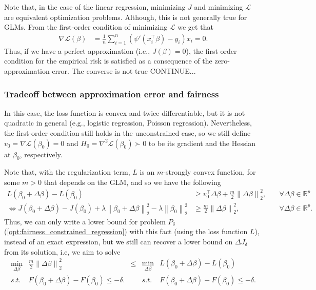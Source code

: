 \documentclass[11pt]{article}
\theoremstyle{plain}
\theoremstyle{definition}
\newcommand{\R}{\mathbb{R}}
\newcommand{\norm}[1]{\left\lVert #1 \right\rVert}
\newcommand{\1}{\mathbf{1}}
\renewcommand{\L}{\mathcal{L}}
\renewcommand{\t}{^{\top}}
\renewcommand{\R}{\mathbb{R}}
\begin{document}
Note that, in the case of the linear regression, minimizing $J$ and minimizing $\L$ are equivalent optimization problems. Although, this is not generally true for GLMs. From the first-order condition of minimizing $\L$ we get that
\begin{align*}
\nabla \L(\beta) &= \frac{1}{n} \sum_{i=1}^n \left( \psi'(x_i\t\beta) - y_i \right)x_i = 0.
\end{align*}
Thus, if we have a perfect approximation (i.e., $J(\beta)=0$), the first order condition for the empirical risk is satisfied as a consequence of the zero-approximation error. The converse is not true {\color{red} CONTINUE...} 

\subsubsection{Tradeoff between approximation error and fairness}

In this case, the loss function is convex and twice differentiable, but it is not quadratic in general (e.g., logistic regression, Poisson regression). Nevertheless, the first-order condition still holds in the unconstrained case, so we still define $v_0 = \nabla \L(\beta_0)=0$ and $H_0 = \nabla^2 \L(\beta_0) \succ 0$ to be its gradient and the Hessian at $\beta_0$, respectively. 



Note that, with the regularization term, $L$ is an $m$-strongly convex function, for some $m>0$ that depends on the GLM, and so we have the following
\begin{align*}
L(\beta_0 + \Delta \beta)-L(\beta_0)&\geq v_0\t\Delta \beta + \frac{m}{2}\norm{\Delta \beta}^2_{2},& \quad \forall \Delta \beta \in \R^p    \\ 
\iff J(\beta_0 + \Delta \beta) - J(\beta_0) + \lambda \norm{\beta_0+\Delta \beta}_2^2 - \lambda \norm{\beta_0}_2^2  &\geq \frac{m}{2}\norm{\Delta \beta}^2_{2},& \quad \forall \Delta \beta \in \R^p.    
\end{align*}
Thus, we can only write a lower bound for problem $P_\delta$ (\ref{opt:fairness_constrained_regression}) with this fact (using the loss function $L$), instead of an exact expression, but we still can recover a lower bound on $\Delta J_\delta$ from its solution, i.e, we aim to solve
\begin{equation}
    \begin{array}{ccc}
      \displaystyle  \min_{\Delta \beta} &  \frac{m}{2}\norm{\Delta \beta}^2_{2} & \leq \\
        s.t. & F(\beta_0 + \Delta \beta)-F(\beta_0) \leq -\delta. %
    \end{array} \begin{array}{cc}
      \displaystyle  \min_{\Delta \beta} & L(\beta_0 + \Delta \beta)-L(\beta_0)  \\
        s.t. & F(\beta_0 + \Delta \beta)-F(\beta_0) \leq -\delta. %
    \end{array}
\end{equation}
\end{document}
